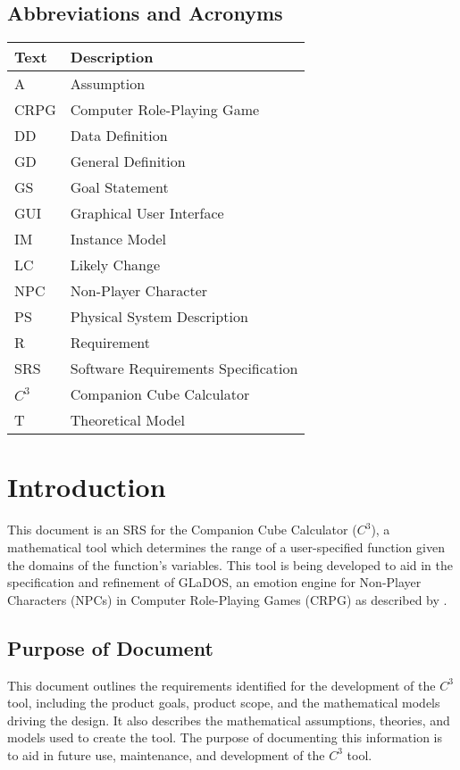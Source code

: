 \documentclass[12pt]{article}
\newcommand{\progname}{Companion Cube Calculator} %
\newcommand{\prognameAbbrv}{$C^{3}$}
\begin{document}
\subsection{Abbreviations and Acronyms}

\renewcommand{\arraystretch}{1.2}
\begin{tabular}{l l} 
  \toprule		
  \textbf{Text} & \textbf{Description}\\
  \midrule 
  A & Assumption\\
  CRPG & Computer Role-Playing Game\\
  DD & Data Definition\\
  GD & General Definition\\
  GS & Goal Statement\\
  GUI & Graphical User Interface\\
  IM & Instance Model\\
  LC & Likely Change\\
  NPC & Non-Player Character\\
  PS & Physical System Description\\
  R & Requirement\\
  SRS & Software Requirements Specification\\
  \prognameAbbrv{} & \progname{}\\
  T & Theoretical Model\\
  \bottomrule
\end{tabular}

\newpage
{}

\section{Introduction}
\label{intro}
This document is an SRS for the \progname{} (\prognameAbbrv{}), a mathematical 
tool which determines the range of a user-specified function given the domains 
of the function's variables. This tool is being developed to aid in the 
specification and refinement of GLaDOS, an emotion engine for Non-Player 
Characters (NPCs) in Computer Role-Playing Games (CRPG) as described by 
\citet{glados}.

\subsection{Purpose of Document}
This document outlines the requirements identified for the development of the 
\prognameAbbrv{} tool, including the product goals, product scope, and the 
mathematical models driving the design. It also describes the mathematical 
assumptions, theories, and models used to create the tool. The purpose of 
documenting this information is to aid in future use, maintenance, and 
development of the \prognameAbbrv{} tool.
\end{document}
